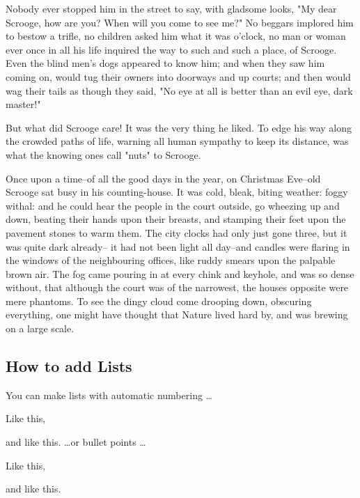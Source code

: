 \documentclass[twocolumn]{article}
\let\tempone\itemize
\let\temptwo\enditemize
\let\tempthree\enumerate
\let\tempfour\endenumerate
\renewenvironment{itemize}{\tempone\setlength{\itemsep}{0pt}}{\temptwo}
\renewenvironment{enumerate}{\tempthree\setlength{\itemsep}{0pt}}{\tempfour}
\begin{document}
Nobody ever stopped him in the street to say, with
gladsome looks, "My dear Scrooge, how are you?
When will you come to see me?" No beggars implored
him to bestow a trifle, no children asked him
what it was o'clock, no man or woman ever once in all
his life inquired the way to such and such a place, of
Scrooge. Even the blind men's dogs appeared to
know him; and when they saw him coming on, would
tug their owners into doorways and up courts; and
then would wag their tails as though they said, "No
eye at all is better than an evil eye, dark master!"

But what did Scrooge care! It was the very thing
he liked. To edge his way along the crowded paths
of life, warning all human sympathy to keep its distance,
was what the knowing ones call "nuts" to Scrooge.


Once upon a time--of all the good days in the year,
on Christmas Eve--old Scrooge sat busy in his
counting-house. It was cold, bleak, biting weather: foggy
withal: and he could hear the people in the court outside,
go wheezing up and down, beating their hands
upon their breasts, and stamping their feet upon the
pavement stones to warm them. The city clocks had
only just gone three, but it was quite dark already--
it had not been light all day--and candles were flaring
in the windows of the neighbouring offices, like
ruddy smears upon the palpable brown air. The fog
came pouring in at every chink and keyhole, and was
so dense without, that although the court was of the
narrowest, the houses opposite were mere phantoms.
To see the dingy cloud come drooping down, obscuring
everything, one might have thought that Nature
lived hard by, and was brewing on a large scale.


\subsection{How to add Lists}

You can make lists with automatic numbering \dots

\begin{enumerate}
\item Like this,
\item and like this.
\end{enumerate}
\dots or bullet points \dots
\begin{itemize}
\item Like this,
\item and like this.
\end{itemize}
\end{document}
